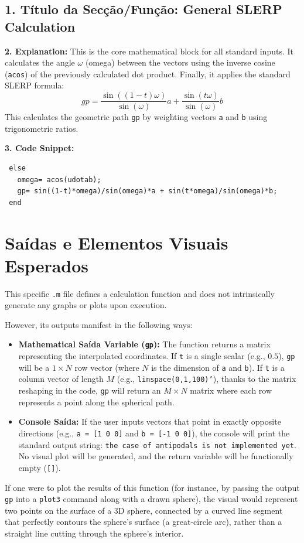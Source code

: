\subsection*{1. Título da Secção/Função: General SLERP Calculation}
\textbf{2. Explanation:} This is the core mathematical block for all standard inputs. It calculates the angle $\omega$ (omega) between the vectors using the inverse cosine (\texttt{acos}) of the previously calculated dot product. Finally, it applies the standard SLERP formula:
$$ gp = \frac{\sin((1-t)\omega)}{\sin(\omega)}a + \frac{\sin(t\omega)}{\sin(\omega)}b $$
This calculates the geometric path \texttt{gp} by weighting vectors \texttt{a} and \texttt{b} using trigonometric ratios.

\textbf{3. Code Snippet:}
\begin{lstlisting}
 else
   omega= acos(udotab);
   gp= sin((1-t)*omega)/sin(omega)*a + sin(t*omega)/sin(omega)*b;
 end
\end{lstlisting}

\section{Saídas e Elementos Visuais Esperados}

This specific \texttt{.m} file defines a calculation function and does not intrinsically generate any graphs or plots upon execution. 

However, its outputs manifest in the following ways:
\begin{itemize}
    \item \textbf{Mathematical Saída Variable (\texttt{gp}):} The function returns a matrix representing the interpolated coordinates. If \texttt{t} is a single scalar (e.g., $0.5$), \texttt{gp} will be a $1 \times N$ row vector (where $N$ is the dimension of \texttt{a} and \texttt{b}). If \texttt{t} is a column vector of length $M$ (e.g., \texttt{linspace(0,1,100)'}), thanks to the matrix reshaping in the code, \texttt{gp} will return an $M \times N$ matrix where each row represents a point along the spherical path.
    \item \textbf{Console Saída:} If the user inputs vectors that point in exactly opposite directions (e.g., \texttt{a = [1 0 0]} and \texttt{b = [-1 0 0]}), the console will print the standard output string: \texttt{the case of antipodals is not implemented yet}. No visual plot will be generated, and the return variable will be functionally empty (\texttt{[]}).
\end{itemize}

If one were to plot the results of this function (for instance, by passing the output \texttt{gp} into a \texttt{plot3} command along with a drawn sphere), the visual would represent two points on the surface of a 3D sphere, connected by a curved line segment that perfectly contours the sphere's surface (a great-circle arc), rather than a straight line cutting through the sphere's interior.
